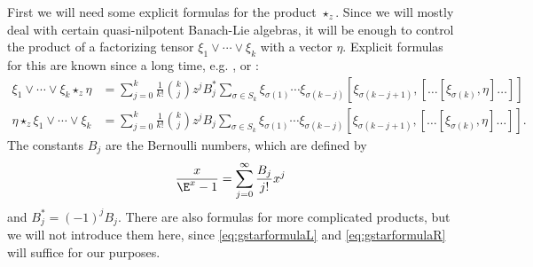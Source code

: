 \documentclass[
11pt,                          %
english                        %
]{article}
\begin{document}
First we will need some explicit formulas for the product $\star_z$. Since we will 
mostly deal with certain quasi-nilpotent Banach-Lie algebras, it will be enough to 
control the product of a factorizing tensor $\xi_1 \vee \cdots \vee \xi_k$ with a 
vector $\eta$. Explicit formulas for this are known since a long time, e.g. 
\cite[Prop. 1]{gutt:1983a}, \cite[2.8.12 (c)]{dixmier:1977a} or \cite[Prop. 2.6]
{esposito.stapor.waldmann:2015a:pre}:
\begin{align}
    \label{eq:gstarformulaR}
    \xi_1 \vee \cdots \vee \xi_k \star_z \eta
    &=
    \sum\limits_{j=0}^k
    \frac{1}{k!} \binom{k}{j}
    z^j B_j^*
    \sum\limits_{\sigma \in S_k}
    \xi_{\sigma(1)} \cdots \xi_{\sigma(k - j)}
    [\xi_{\sigma(k - j + 1)},
    [ \ldots [\xi_{\sigma(k)}, \eta] \ldots ]
    ]
    \\
    \label{eq:gstarformulaL}
    \eta \star_z \xi_1 \vee \cdots \vee \xi_k
    &=
    \sum\limits_{j=0}^k
    \frac{1}{k!} \binom{k}{j}
    z^j B_j
    \sum\limits_{\sigma \in S_k}
    \xi_{\sigma(1)} \cdots \xi_{\sigma(k - j)}
    [\xi_{\sigma(k - j + 1)},
    [ \ldots [\xi_{\sigma(k)}, \eta] \ldots ]
    ]
    .    
\end{align}
The constants $B_j$ are the Bernoulli numbers, which are defined by
\begin{equation}
	\frac{x}{\E^x - 1}
	=
	\sum\limits_{j=0}^\infty
	\frac{B_j}{j!}
	x^j
\end{equation}
and $B_j^* = (-1)^j B_j$. There are also formulas for more complicated products, but 
we will not introduce them here, since \eqref{eq:gstarformulaL} and 
\eqref{eq:gstarformulaR} will suffice for our purposes.
\end{document}
